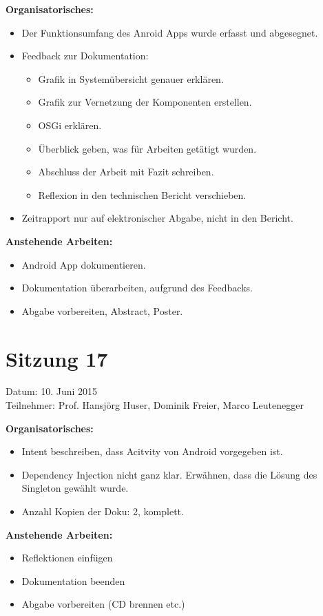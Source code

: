 	\textbf{Organisatorisches:}
	\begin{itemize}
		\item Der Funktionsumfang des Anroid Apps wurde erfasst und abgesegnet.
		\item Feedback zur Dokumentation:
		\begin{itemize}
			\item Grafik in Systemübersicht genauer erklären.
			\item Grafik zur Vernetzung der Komponenten erstellen.
			\item OSGi erklären.
			\item Überblick geben, was für Arbeiten getätigt wurden.
			\item Abschluss der Arbeit mit Fazit schreiben.
			\item Reflexion in den technischen Bericht verschieben.
		\end{itemize}
		\item Zeitrapport nur auf elektronischer Abgabe, nicht in den Bericht.
	\end{itemize}

	\textbf{Anstehende Arbeiten:}
	\begin{itemize}
		\item Android App dokumentieren.
		\item Dokumentation überarbeiten, aufgrund des Feedbacks.
		\item Abgabe vorbereiten, Abstract, Poster.
	\end{itemize}

\section*{Sitzung 17}
	Datum: 10. Juni 2015 \\
	Teilnehmer: Prof. Hansjörg Huser, Dominik Freier, Marco Leutenegger

	\textbf{Organisatorisches:}
	\begin{itemize}
		\item Intent beschreiben, dass Acitvity von Android vorgegeben ist.
		\item Dependency Injection nicht ganz klar. Erwähnen, dass die Lösung des Singleton gewählt wurde.
		\item Anzahl Kopien der Doku: 2, komplett.
	\end{itemize}

	\textbf{Anstehende Arbeiten:}
	\begin{itemize}
		\item Reflektionen einfügen
		\item Dokumentation beenden
		\item Abgabe vorbereiten (CD brennen etc.)
	\end{itemize}
	
	
	
	
	
	
	
	
	
	
	
	
	
	
	
	
	
	
	
	
	
	